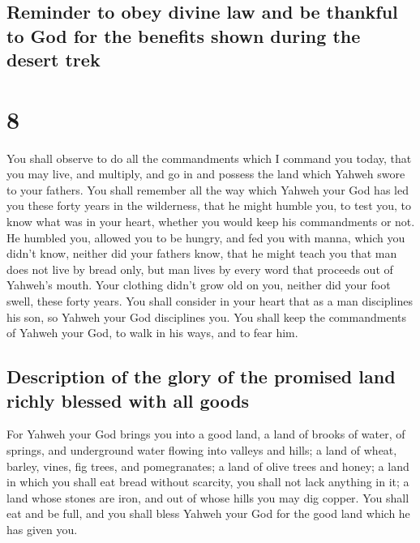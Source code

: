 \hypertarget{reminder-to-obey-divine-law-and-be-thankful-to-god-for-the-benefits-shown-during-the-desert-trek}{%
\subsection{Reminder to obey divine law and be thankful to God for the
benefits shown during the desert
trek}\label{reminder-to-obey-divine-law-and-be-thankful-to-god-for-the-benefits-shown-during-the-desert-trek}}

\hypertarget{section-7}{%
\section{8}\label{section-7}}

 You shall observe to do all the commandments which I
command you today, that you may live, and multiply, and go in and
possess the land which Yahweh swore to your fathers.  You
shall remember all the way which Yahweh your God has led you these forty
years in the wilderness, that he might humble you, to test you, to know
what was in your heart, whether you would keep his commandments or not.
 He humbled you, allowed you to be hungry, and fed you
with manna, which you didn't know, neither did your fathers know, that
he might teach you that man does not live by bread only, but man lives
by every word that proceeds out of Yahweh's mouth.  Your
clothing didn't grow old on you, neither did your foot swell, these
forty years.  You shall consider in your heart that as a
man disciplines his son, so Yahweh your God disciplines you.
 You shall keep the commandments of Yahweh your God, to
walk in his ways, and to fear him.

\hypertarget{description-of-the-glory-of-the-promised-land-richly-blessed-with-all-goods}{%
\subsection{Description of the glory of the promised land richly blessed
with all
goods}\label{description-of-the-glory-of-the-promised-land-richly-blessed-with-all-goods}}

 For Yahweh your God brings you into a good land, a land
of brooks of water, of springs, and underground water flowing into
valleys and hills;  a land of wheat, barley, vines, fig
trees, and pomegranates; a land of olive trees and honey; 
a land in which you shall eat bread without scarcity, you shall not lack
anything in it; a land whose stones are iron, and out of whose hills you
may dig copper.  You shall eat and be full, and you shall
bless Yahweh your God for the good land which he has given you.

